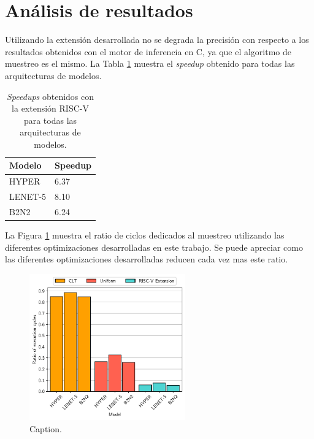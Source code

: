 
\section{Análisis de resultados}

Utilizando la extensión desarrollada no se degrada la precisión con respecto a los resultados obtenidos con el motor de inferencia en C, ya que el algoritmo de muestreo es el mismo. La Tabla \ref{tab:riscv_speedup} muestra el \textit{speedup} obtenido para todas las arquitecturas de modelos.

\begin{table}[h]
    \centering
    \caption{\textit{Speedups} obtenidos con la extensión RISC-V para todas las arquitecturas de modelos.}
    \label{tab:riscv_speedup}
    \begin{tabular}{ll}
    \hline
     \textbf{Modelo}& \textbf{Speedup} \\ \hline
    HYPER& 6.37\\
    LENET-5& 8.10\\
    B2N2& 6.24\\ \hline
    \end{tabular}
\end{table}

La Figura \ref{fig:ratio_all} muestra el ratio de ciclos dedicados al muestreo utilizando las diferentes optimizaciones desarrolladas en este trabajo. Se puede apreciar como las diferentes optimizaciones desarrolladas reducen cada vez mas este ratio.

\begin{figure}[h]
    \centering
    \includegraphics[width=0.6\textwidth]{root/Imagenes/5_riscv/ratio_all.pdf}
    \caption{Caption.}
    \label{fig:ratio_all}
\end{figure}

